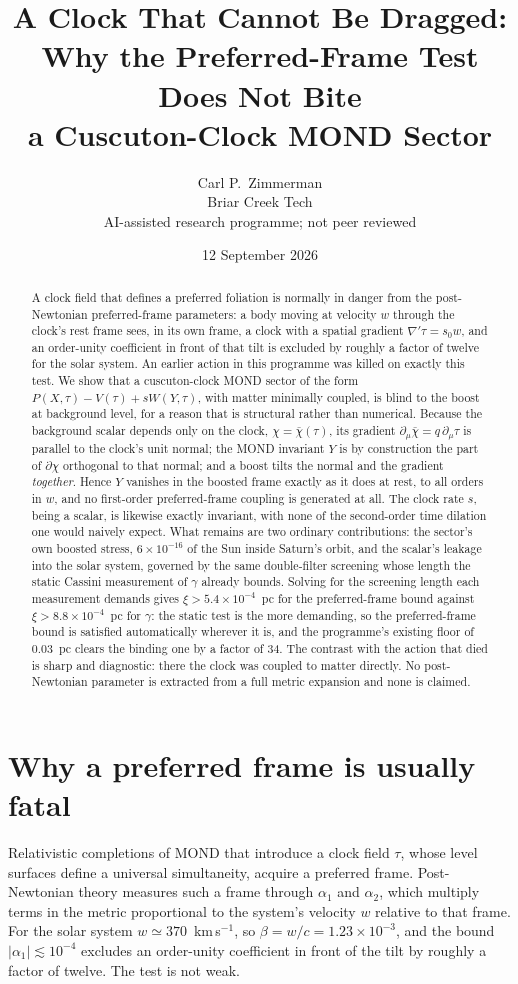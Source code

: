\documentclass[11pt,letterpaper]{article}
\title{A Clock That Cannot Be Dragged:\\ Why the Preferred-Frame Test Does Not Bite\\ a Cuscuton-Clock MOND Sector}
\author{Carl P.\ Zimmerman\\ \small Briar Creek Tech\\ \small AI-assisted research programme; not peer reviewed}
\date{12 September 2026}
\begin{document}
\maketitle
\begin{abstract}
A clock field that defines a preferred foliation is normally in danger from the post-Newtonian preferred-frame parameters: a body moving at velocity $w$ through the clock's rest frame sees, in its own frame, a clock with a spatial gradient $\nabla'\tau=s_0w$, and an order-unity coefficient in front of that tilt is excluded by roughly a factor of twelve for the solar system. An earlier action in this programme was killed on exactly this test. We show that a cuscuton-clock MOND sector of the form $P(X,\tau)-V(\tau)+sW(Y,\tau)$, with matter minimally coupled, is blind to the boost at background level, for a reason that is structural rather than numerical. Because the background scalar depends only on the clock, $\chi=\bar\chi(\tau)$, its gradient $\partial_\mu\bar\chi=q\,\partial_\mu\tau$ is parallel to the clock's unit normal; the MOND invariant $Y$ is by construction the part of $\partial\chi$ orthogonal to that normal; and a boost tilts the normal and the gradient \emph{together}. Hence $Y$ vanishes in the boosted frame exactly as it does at rest, to all orders in $w$, and no first-order preferred-frame coupling is generated at all. The clock rate $s$, being a scalar, is likewise exactly invariant, with none of the second-order time dilation one would naively expect. What remains are two ordinary contributions: the sector's own boosted stress, $6\times10^{-16}$ of the Sun inside Saturn's orbit, and the scalar's leakage into the solar system, governed by the same double-filter screening whose length the static Cassini measurement of $\gamma$ already bounds. Solving for the screening length each measurement demands gives $\xi>5.4\times10^{-4}$~pc for the preferred-frame bound against $\xi>8.8\times10^{-4}$~pc for $\gamma$: the static test is the more demanding, so the preferred-frame bound is satisfied automatically wherever it is, and the programme's existing floor of $0.03$~pc clears the binding one by a factor of 34. The contrast with the action that died is sharp and diagnostic: there the clock was coupled to matter directly. No post-Newtonian parameter is extracted from a full metric expansion and none is claimed.
\end{abstract}

\section{Why a preferred frame is usually fatal}
Relativistic completions of MOND that introduce a clock field $\tau$, whose level surfaces define a universal simultaneity, acquire a preferred frame. Post-Newtonian theory measures such a frame through $\alpha_1$ and $\alpha_2$, which multiply terms in the metric proportional to the system's velocity $w$ relative to that frame. For the solar system $w\simeq370$~km\,s$^{-1}$, so $\beta=w/c=1.23\times10^{-3}$, and the bound $|\alpha_1|\lesssim10^{-4}$ excludes an order-unity coefficient in front of the tilt by roughly a factor of twelve. The test is not weak.
\end{document}
